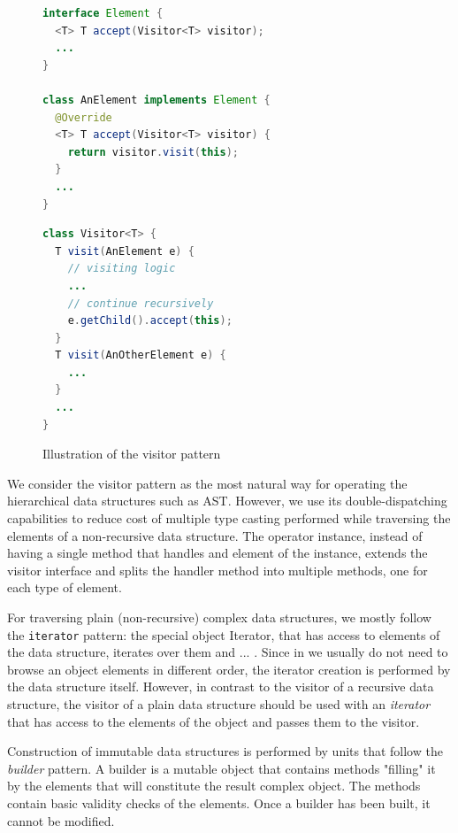\begin{figure}[h]
\centering
\begin{minipage}[t]{.55\textwidth}
\begin{lstlisting}[language=java]
interface Element {
  <T> T accept(Visitor<T> visitor);
  ...
}

class AnElement implements Element {
  @Override
  <T> T accept(Visitor<T> visitor) {
    return visitor.visit(this);
  }
  ...
}
\end{lstlisting}
\end{minipage}%
\begin{minipage}[t]{.45\textwidth}
\begin{lstlisting}[language=java]
class Visitor<T> {
  T visit(AnElement e) {
    // visiting logic
    ...
    // continue recursively
    e.getChild().accept(this);
  }
  T visit(AnOtherElement e) {
    ...
  }
  ...
}
\end{lstlisting}
\end{minipage}
\caption{Illustration of the visitor pattern}
\label{fig:visitor}
\end{figure}

We consider the visitor pattern as the most natural way for operating the hierarchical data structures such as AST.
However, we use its double-dispatching capabilities to reduce cost of multiple type casting performed while traversing the elements of a non-recursive data structure.
The operator instance, instead of having a single method that handles and element of the instance, extends the visitor interface and splits the handler method into multiple methods, one for each type of element.

For traversing plain (non-recursive) complex data structures, we mostly follow the \texttt{iterator} pattern: the special object Iterator, that has access to elements of the data structure, iterates over them and ...
. Since in \porthos[] we usually do not need to browse an object elements in different order, the iterator creation is performed by the data structure itself.
However, in contrast to the visitor of a recursive data structure, the visitor of a plain data structure should be used with an \textit{iterator} that has access to the elements of the object and passes them to the visitor.

Construction of immutable data structures is performed by units that follow the \textit{builder} pattern.
A builder is a mutable object that contains methods "filling" it by the elements that will constitute the result complex object.
The methods contain basic validity checks of the elements.
Once a builder has been built, it cannot be modified.


